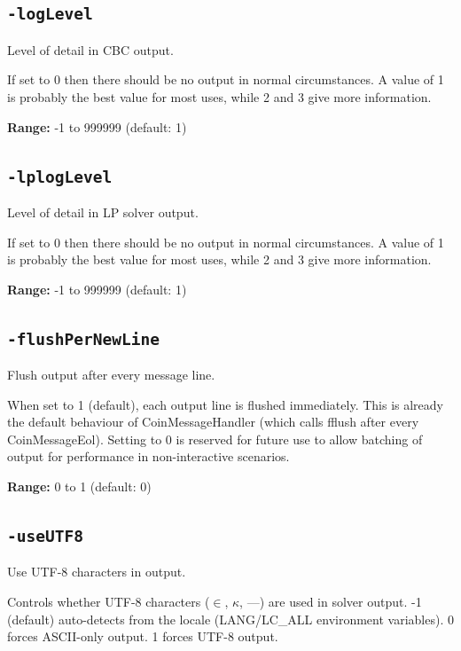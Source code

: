 \documentclass[11pt,a4paper]{article}
\begin{document}
\subsection*{\texttt{-logLevel}}

Level of detail in CBC output.

If set to 0 then there should be no output in normal circumstances. A value of 1 is probably the best value for most uses, while 2 and 3 give more information.

\textbf{Range:} -1 to 999999 (default: 1)

\subsection*{\texttt{-lplogLevel}}

Level of detail in LP solver output.

If set to 0 then there should be no output in normal circumstances. A value of 1 is probably the best value for most uses, while 2 and 3 give more information.

\textbf{Range:} -1 to 999999 (default: 1)

\subsection*{\texttt{-flushPerNewLine}}

Flush output after every message line.

When set to 1 (default), each output line is flushed immediately. This is already the default behaviour of CoinMessageHandler (which calls fflush after every CoinMessageEol). Setting to 0 is reserved for future use to allow batching of output for performance in non-interactive scenarios.

\textbf{Range:} 0 to 1 (default: 0)

\subsection*{\texttt{-useUTF8}}

Use UTF-8 characters in output.

Controls whether UTF-8 characters ($\in$, $\kappa$, ---) are used in solver output. -1 (default) auto-detects from the locale (LANG/LC\_ALL environment variables). 0 forces ASCII-only output. 1 forces UTF-8 output.
\end{document}
